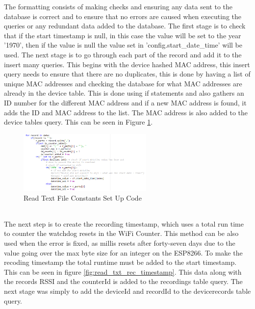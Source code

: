 \documentclass{report}
\begin{document}
The formatting consists of making checks and ensuring any data sent to the database is correct and to ensure that no errors are caused when executing the queries or any redundant data added to the database. The first stage is to check that if the start timestamp is null, in this case the value will be set to the year '1970', then if the value is null the value set in 'config.start\_date\_time' will be used. The next stage is to go through each part of the record and add it to the insert many queries. This begins with the device hashed MAC address, this insert query needs to ensure that there are no duplicates, this is done by having a list of unique MAC addresses and checking the database for what MAC addresses are already in the device table. This is done using if statements and also gathers an ID number for the different MAC address and if a new MAC address is found, it adds the ID and MAC address to the list. The MAC address is also added to the device tables query. This can be seen in Figure \ref{fig:read_txt_constants}.\\ \newline
\begin{figure}[h!]
    \centering
    \includegraphics[width=250]{constant_set_up.PNG}
    \caption{Read Text File Constants Set Up Code}
    \label{fig:read_txt_constants}
\end{figure}{} \\
The next step is to create the recording timestamp, which uses a total run time to counter the watchdog resets in the WiFi Counter. This method can be also used when the error is fixed, as millis resets after forty-seven days due to the value going over the max byte size for an integer on the ESP8266. To make the recoding timestamp the total runtime must be added to the start timestamp. This can be seen in figure \ref{fig:read_txt_rec_timestamp}. This data along with the records RSSI and the counterId is added to the recordings table query. The next stage was simply to add the deviceId and recordId to the devicerecords table query.\\ \newline
\end{document}
